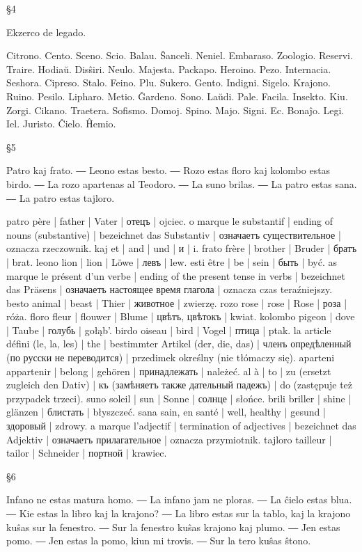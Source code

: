 §4

Ekzerco de legado.

Citrono. Cento. Sceno. Scio. Balau. Ŝanceli. Neniel. Embaraso. Zoologio. Reservi. Traire. Hodiaŭ. Disŝiri. Neulo. Majesta. Packapo. Heroino. Pezo. Internacia. Seshora. Cipreso. Stalo. Feino. Plu. Sukero. Gento. Indigni. Sigelo. Krajono. Ruino. Pesilo. Lipharo. Metio. Ĝardeno. Sono. Laŭdi. Pale. Facila. Insekto. Kiu. Zorgi. Cikano. Traetera. Sofismo. Domoj. Spino. Majo. Signi. Ec. Bonaĵo. Legi. Iel. Juristo. Ĉielo. Ĥemio.

§5

Patro kaj frato. ― Leono estas besto. ― Rozo estas floro kaj kolombo estas birdo. ― La rozo apartenas al Teodoro. ― La suno brilas. ― La patro estas sana. ― La patro estas tajloro.

patro père | father | Vater | отецъ | ojciec.
o marque le substantif | ending of nouns (substantive) | bezeichnet das Substantiv | означаетъ существительное | oznacza rzeczownik.
kaj et | and | und | и | i.
frato frère | brother | Bruder | братъ | brat.
leono lion | lion | Löwe | левъ | lew.
esti être | be | sein | быть | być.
as marque le présent d’un verbe | ending of the present tense in verbs | bezeichnet das Präsens | означаетъ настоящее время глагола | oznacza czas teraźniejszy.
besto animal | beast | Thier | животное | zwierzę.
rozo rose | rose | Rose | роза | róża.
floro fleur | flouwer | Blume | цвѣтъ, цвѣтокъ | kwiat.
kolombo pigeon | dove | Taube | голубь | gołąb’.
birdo oiseau | bird | Vogel | птица | ptak.
la article défini (le, la, les) | the | bestimmter Artikel (der, die, das) | членъ опредѣленный (по русски не переводится) | przedimek określny (nie tłómaczy się).
aparteni appartenir | belong | gehören | принадлежать | należeć.
al à | to | zu (ersetzt zugleich den Dativ) | къ (замѣняетъ также дательный падежъ) | do (zastępuje też przypadek trzeci).
suno soleil | sun | Sonne | солнце | słońce.
brili briller | shine | glänzen | блистать | błyszczeć.
sana sain, en santé | well, healthy | gesund | здоровый | zdrowy.
a marque l’adjectif | termination of adjectives | bezeichnet das Adjektiv | означаетъ прилагательное | oznacza przymiotnik.
tajloro tailleur | tailor | Schneider | портной | krawiec.

§6

Infano ne estas matura homo. ― La infano jam ne ploras. ― La ĉielo estas blua. ― Kie estas la libro kaj la krajono? ― La libro estas sur la tablo, kaj la krajono kuŝas sur la fenestro. ― Sur la fenestro kuŝas krajono kaj plumo. ― Jen estas pomo. ― Jen estas la pomo, kiun mi trovis. ― Sur la tero kuŝas ŝtono.

